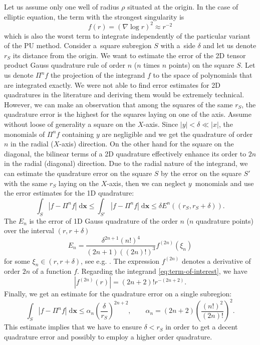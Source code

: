 \documentclass{elsarticle}
\def\vc#1{\mathbf{\boldsymbol{#1}}}     %
\def\abs#1{\left|#1\right|}
\def\abs#1{| #1 |}
\newcommand{\dd}{\; \mathrm{d}}
\newcommand{\bx}{\vc{x}}
\begin{document}
Let us assume only one well of radius $\rho$ situated at the origin. In the case of elliptic equation, the term with the strongest singularity is 
\begin{equation}
    \label{eq:term-of-interest}
    f(r)=(\nabla \log r )^2 \approx r^{-2}
\end{equation}
which is also the worst term to integrate independently of the particular variant of the PU method.
Consider a~square subregion $S$ with a~side $\delta$ and 
let us denote $r_{S}$ its distance from the origin.
We want to estimate the error of the 2D tensor product Gauss quadrature rule of order $n$ ($n$ times $n$ points) on the square $S$. 
Let us denote 
$\Pi^n f$ the projection of the integrand $f$ to the space of polynomials that are integrated exactly.
We were not able to find error estimates for 2D quadratures in the literature and deriving them would be extremely technical.
However, we can make an observation that among the squares of the same $r_{S}$, the quadrature error is the highest for the squares laying on one of the axis.
Assume without loose of generality a square on the $X$-axis. Since $\abs{y}<\delta \ll \abs{x}$, the monomials of $\Pi^n f$ containing $y$ 
are negligible and we get the quadrature
of order $n$ in the radial ($X$-axis) direction. On the other hand for the square on the diagonal, the bilinear terms of 
a 2D quadrature effectively enhance its order to $2n$ in the radial (diagonal) direction. Due to the radial nature of the integrand,
we can estimate the quadrature error on the square $S$ by the error on the square $S'$ with the same $r_S$ laying on the $X$-axis, then we can 
neglect $y$~monomials and use the error estimates for the 1D quadrature:
\[
  \int_S \abs{f-\Pi^n f} \dd\bx \le \int_{S'}\abs{f-\Pi^n f} \dd\bx \le \delta E^n((r_{S}, r_{S}+\delta)).
\]
The $E_n$ is the error of 1D Gauss quadrature of the order $n$ ($n$ quadrature points) over the interval $(r,r+\delta)$
\[
  E_n = \frac{\delta^{2n+1} (n!)^4}{(2n+1)((2n)!)^3} f^{(2n)}(\xi_n) 
\]
for some $\xi_n \in (r, r+\delta)$, see e.g. \cite{kahaner_numerical_1989}. 
The expression $f^{(2n)}$ denotes a derivative of order $2n$ of a function $f$.
Regarding the integrand \eqref{eq:term-of-interest}, we have 
\[
  \abs{f^{(2n)}(r)} = (2n+2)! r^{-(2n+2)}.
\]
Finally, we get an estimate for the quadrature error on a single subregion:
\[
    \int_S \abs{f-\Pi^n f}  \dd\bx \le  \alpha_n \left( \frac{\delta}{r_{S}} \right)^{2n+2}, 
  \qquad \alpha_n = (2n+2)\left( \frac{(n!)^2}{(2n)!} \right)^2.
\]
This estimate implies that we have to ensure $\delta < r_S$ in order to get a decent quadrature error 
and possibly to employ a higher order quadrature. 
\end{document}
